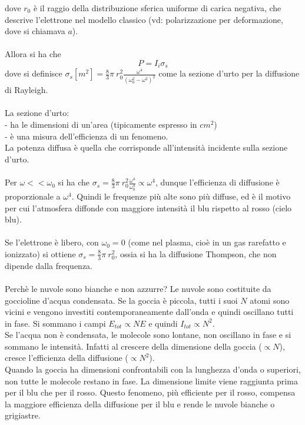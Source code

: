 \documentclass{article}
\begin{document}
dove $r_0$ è il raggio della distribuzione sferica uniforme di carica negativa, che descrive l’elettrone nel modello classico (vd: polarizzazione per deformazione, dove si chiamava $a$).\\
\\
Allora si ha che 
\begin{equation}
    P=I_i\sigma_s
\nonumber
\end{equation}
dove si definisce $\sigma_s[m^2]=\frac{8}{3}\pi \ r_0^2\frac{\omega^4}{(\omega_0^2-\omega^2)^2}$ come la sezione d'urto per la diffusione di Rayleigh.\\
\\
La sezione d’urto:\\
- ha le dimensioni di un’area (tipicamente espresso in $cm^2$)\\
- è una misura dell’efficienza di un fenomeno.\\
La potenza diffusa è quella che corrisponde all’intensità incidente sulla sezione d’urto.\\
\\
Per $\omega<<\omega_0$ si ha che $\sigma_s=\frac{8}{3}\pi \ r_0^2\frac{\omega^4}{\omega_0^4} \propto \omega^4$, dunque l'efficienza di diffusione è proporzionale a $\omega^4$. Quindi le frequenze più alte sono più diffuse, ed è il motivo per cui l'atmosfera diffonde con maggiore intensità il blu rispetto al rosso (cielo blu).\\
\\
Se l'elettrone è libero, con $\omega_0 = 0$ (come nel plasma, cioè in un gas rarefatto e ionizzato) si ottiene $\sigma_s=\frac{8}{3}\pi \ r_0^2$, ossia si ha la diffusione Thompson, che non dipende dalla frequenza.\\
\\
Perchè le nuvole sono bianche e non azzurre?
Le nuvole sono costituite da goccioline d’acqua condensata.
Se la goccia è piccola, tutti i suoi $N$ atomi sono vicini e vengono investiti contemporaneamente dall’onda e quindi oscillano tutti in fase. Si sommano i campi $E_{tot}\propto NE$ e quindi $I_{tot}\propto N^2$.\\
Se l’acqua non è condensata, le molecole sono lontane, non oscillano in fase e si sommano le intensità. Infatti al crescere della dimensione della goccia ($\propto N$), cresce l’efficienza della diffusione ($\propto N^2$).\\
Quando la goccia ha dimensioni confrontabili con la lunghezza d’onda o superiori, non tutte le molecole restano in fase. La dimensione limite viene raggiunta prima per il blu che per il rosso. Questo fenomeno, più efficiente per il rosso, compensa la maggiore efficienza della diffusione per il blu e rende le nuvole bianche o grigiastre.\\
\end{document}

